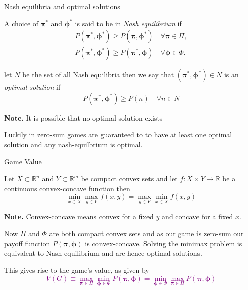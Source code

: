 \documentclass[11pt]{beamer}
\begin{document}
\begin{frame}{Nash equilibria and optimal solutions}
\begin{definition}
A choice of $\bm{\pi}^*$ and $\bm{\phi}^*$ is said to be in \textit{Nash equilibrium} if 
\begin{align*}
P(\bm{\pi}^*,\bm{\phi}^*) \geq P(\bm{\pi},\bm{\phi}^*) \quad \forall \bm{\pi} \in \Pi , \\
P(\bm{\pi}^*,\bm{\phi}^*) \geq P(\bm{\pi}^*,\bm{\phi}) \quad \forall \bm{\phi} \in \Phi .
\end{align*}
\end{definition}

\pause

\begin{definition}
let $N$ be the set of all Nash equilibria then we say that $(\bm{\pi}^{*},\bm{\phi}^{*}) \in N$ is an \textit{optimal solution} if
$$P(\bm{\pi}^{*},\bm{\phi}^{*}) \geq P(n) \quad \forall n \in N$$ 
\end{definition}

\textbf{Note.} It is possible that no optimal solution exists

\pause

Luckily in zero-sum games are guaranteed to to have at least one optimal solution and any nash-equilbrium is optimal.

\end{frame}

\begin{frame}{Game Value}

\begin{theorem}
Let $X \subset \mathbb{R}^{n}$ and $Y \subset \mathbb{R}^{m}$ be compact convex sets and let $f: X \times Y \rightarrow \mathbb{R}$ be a continuous convex-concave function then
$$\min\limits_{x \in X} \max\limits_{y \in Y} f(x,y) = \max\limits_{y \in Y} \min\limits_{x \in X} f(x,y) $$
\end{theorem}

\textbf{Note.} Convex-concave means convex for a fixed $y$ and concave for a fixed $x$.

\pause
Now $\Pi$ and $\Phi$ are both compact convex sets and as our game is zero-sum our payoff function $P(\bm{\pi},\bm{\phi})$ is convex-concave. Solving the minimax problem is equivalent to Nash-equilibrium and are hence optimal solutions.


This gives rise to the game's value, as given by \textcolor{purple}{$$V(G) \equiv \max\limits_{\bm{\pi} \in \Pi} \min\limits_{\bm{\phi} \in \Phi} P(\bm{\pi},\bm{\phi})=\min\limits_{\bm{\phi} \in \Phi} \max\limits_{\bm{\pi} \in \Pi} P(\bm{\pi},\bm{\phi})$$}
\end{frame}
\end{document}
